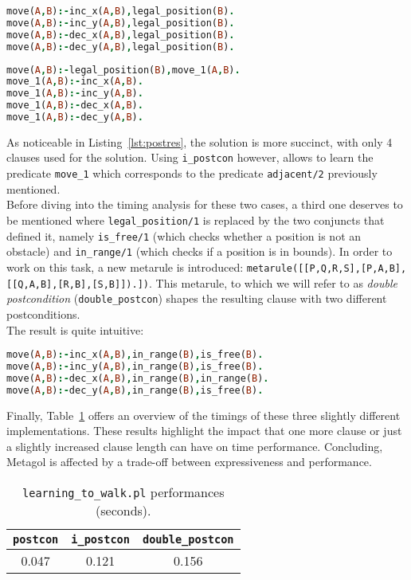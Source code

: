 \begin{lstlisting}[label={lst:postres},language=Prolog, caption=Result of \texttt{postcon}, belowcaptionskip=1cm]
move(A,B):-inc_x(A,B),legal_position(B).
move(A,B):-inc_y(A,B),legal_position(B).
move(A,B):-dec_x(A,B),legal_position(B).
move(A,B):-dec_y(A,B),legal_position(B).
\end{lstlisting}

\begin{lstlisting}[language=Prolog, caption=Result of \texttt{i\_postcon}, belowcaptionskip=1cm]
move(A,B):-legal_position(B),move_1(A,B).
move_1(A,B):-inc_x(A,B).
move_1(A,B):-inc_y(A,B).
move_1(A,B):-dec_x(A,B).
move_1(A,B):-dec_y(A,B).
\end{lstlisting}
As noticeable in Listing~\ref{lst:postres}, the solution is more succinct, with only 4 clauses
used for the solution. Using \texttt{i\_postcon} however, allows to learn the predicate \texttt{move\_1}
which corresponds to the predicate \texttt{adjacent/2} previously mentioned.\\

Before diving into the timing analysis for these two cases, a third one deserves to be mentioned where \texttt{legal\_position/1}
is replaced by the two conjuncts that defined it, namely \texttt{is\_free/1} (which checks whether a position is not an obstacle) and
\texttt{in\_range/1} (which checks if a position is in bounds).
In order to work on this task, a new metarule is introduced: \texttt{metarule([[P,Q,R,S],[P,A,B],[[Q,A,B],[R,B],[S,B]]).])}. This metarule,
to which we will refer to as \emph{double postcondition} (\texttt{double\_postcon}) shapes the resulting clause with two different postconditions.\\
The result is quite intuitive:
\begin{lstlisting}[language=Prolog, caption=Result of \texttt{double\_postcon} result, belowcaptionskip=1cm]
move(A,B):-inc_x(A,B),in_range(B),is_free(B).
move(A,B):-inc_y(A,B),in_range(B),is_free(B).
move(A,B):-dec_x(A,B),in_range(B),in_range(B).
move(A,B):-dec_y(A,B),in_range(B),is_free(B).
\end{lstlisting}

Finally, Table~\ref{tab:walk_res} offers an overview of the timings of these three slightly different implementations. These results highlight the impact that
one more clause or just a slightly increased clause length can have on time performance. Concluding, Metagol is affected by a trade-off between expressiveness and performance.
{
\begin{center}
    \begin{table}[h]
    \centering
    \begin{tabular}{ |c|c|c| } 
        \hline
        \texttt{postcon} & \texttt{i\_postcon} & \texttt{double\_postcon} \\ \hline
        0.047 & 0.121 & 0.156 \\ 
        \hline
    \end{tabular}
    \caption{\label{tab:walk_res}\texttt{learning\_to\_walk.pl} performances (seconds).}
    \end{table}
\end{center}
}

